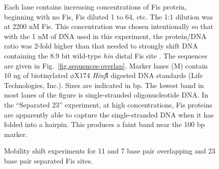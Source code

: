 \documentclass[doublespacing]{narfront}
\newcommand{\fig}[1]{Fig.~\ref{#1}} %
\begin{document}
\begin{figure}[ht]
\caption{Mobility shift experiments for 11 and 7 base pair overlapping
and 23 base pair separated Fis sites.}
\label{fig.gel-overlap}
Each lane contains increasing
concentrations of Fis protein,
beginning with
no Fis, Fis diluted 1 to 64, etc.
The 1:1 dilution was at 2200 nM Fis.
This concentration was chosen intentionally so that with
the 1 nM of DNA used in this experiment,
the protein/DNA ratio was 2-fold higher
than that
needed to strongly shift
DNA containing
the 8.9 bit wild-type \emph{hin} distal Fis site
\cite{Bruist1987}.
The sequences are given in \fig{fig.sequences-overlap}.
Marker lanes (M) contain 10 ng of biotinylated $\phi$X174
\emph{Hinf}I digested DNA standards (Life Technologies, Inc.).
Sizes are indicated in bp.
The lowest band in most lanes of the figure is single-stranded
oligonucleotide DNA.  In the ``Separated 23'' experiment,
at high concentrations, Fis proteins are apparently able to
capture the single-stranded DNA
when it has folded into a hairpin.
This produces a faint band near the 100 bp marker.
%
%
%
%
%
%
%
\end{figure} %
\end{document}
